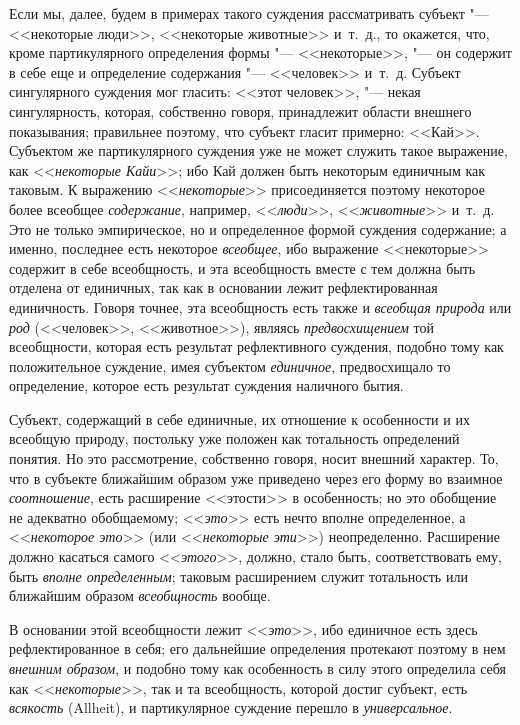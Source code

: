 {Если мы, далее, будем в примерах такого суждения рассматривать
субъект "--- <<некоторые люди>>, <<некоторые животные>> и~т.~д., то
окажется, что, кроме партикулярного определения формы
"--- <<некоторые>>, "--- он содержит в себе еще и
определение содержания "--- <<человек>> и~т.~д. Субъект
сингулярного суждения мог гласить: <<этот человек>>, "--- некая
сингулярность, которая, собственно говоря, принадлежит области внешнего
показывания; правильнее поэтому, что субъект гласит примерно: <<Кай>>.
Субъектом же партикулярного суждения уже не может служить такое выражение,
как <<{\em некоторые
Кайи}>>; ибо Кай должен быть некоторым единичным как таковым.
К выражению <<{\em некоторые}>>
присоединяется поэтому некоторое более всеобщее
{\em содержание},
например, <<{\em люди}>>,
<<{\em животные}>> и~т.~д.
Это не только эмпирическое, но и определенное формой суждения содержание; а
именно, последнее есть некоторое
{\em всеобщее}, ибо
выражение <<некоторые>> содержит в себе всеобщность, и эта всеобщность вместе
с тем должна быть отделена от единичных, так как в основании лежит
рефлектированная единичность. Говоря точнее, эта всеобщность есть также и
{\em всеобщая природа}
или {\em род}
(<<человек>>, <<животное>>), являясь
{\em предвосхищением} той
всеобщности, которая есть результат рефлективного суждения, подобно тому
как положительное суждение, имея субъектом
{\em единичное},
предвосхищало то определение, которое есть результат суждения
наличного бытия.

Субъект, содержащий в себе единичные, их отношение к
особенности и их всеобщую природу, постольку уже положен как тотальность
определений понятия. Но это рассмотрение, собственно говоря, носит внешний
характер. То, что в субъекте ближайшим образом уже приведено через его
форму во взаимное {\em соотношение},
есть расширение <<этости>> в особенность; но это обобщение не
адекватно обобщаемому; <<{\em это}>>
есть нечто вполне определенное, а
<<{\em некоторое это}>>
(или <<{\em некоторые
эти}>>) неопределенно. Расширение должно касаться самого
<<{\em этого}>>, должно,
стало быть, соответствовать ему, быть
{\em вполне определенным};
таковым расширением служит тотальность или ближайшим образом
{\em всеобщность}
вообще.

В основании этой всеобщности лежит
<<{\em это}>>, ибо
единичное есть здесь рефлектированное в себя; его дальнейшие определения
протекают поэтому в нем {\em внешним
образом}, и подобно тому как особенность в силу этого
определила себя как <<{\em некоторые}>>,
так и та всеобщность, которой достиг субъект, есть
{\em всякость}
(Allheit),
и партикулярное суждение перешло в
{\em универсальное}.

}
